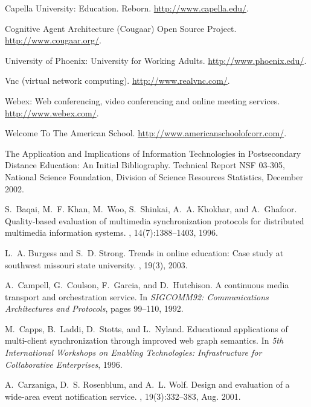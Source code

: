 \documentclass{sig-alternate}
\begin{document}
\begin{thebibliography}{10}
\small
{}
{Capella University: Education. Reborn.}
\newblock \url{http://www.capella.edu/}.

{Cognitive Agent Architecture (Cougaar) Open Source Project}.
\newblock \url{http://www.cougaar.org/}.

{University of Phoenix: University for Working Adults}.
\newblock \url{http://www.phoenix.edu/}.

Vnc (virtual network computing).
\newblock \url{http://www.realvnc.com/}.

Webex: Web conferencing, video conferencing and online meeting services.
\newblock \url{http://www.webex.com/}.

{Welcome To The American School}.
\newblock \url{http://www.americanschoolofcorr.com/}.

{The Application and Implications of Information Technologies in Postsecondary
  Distance Education: An Initial Bibliography}.
\newblock Technical Report NSF 03-305, {National Science Foundation, Division
  of Science Resources Statistics}, December 2002.

S.~Baqai, M.~F. Khan, M.~Woo, S.~Shinkai, A.~A. Khokhar, and A.~Ghafoor.
\newblock Quality-based evaluation of multimedia synchronization protocols for
  distributed multimedia information systems.
,
  14(7):1388--1403, 1996.

L.~A. Burgess and S.~D. Strong.
\newblock Trends in online education: Case study at southwest missouri state
  university.
, 19(3), 2003.

A.~Campell, G.~Coulson, F.~Garcia, and D.~Hutchison.
\newblock A continuous media transport and orchestration service.
\newblock In {\em {SIGCOMM92: Communications Architectures and Protocols}},
  pages 99--110, 1992.

M.~Capps, B.~Laddi, D.~Stotts, and L.~Nyland.
\newblock Educational applications of multi-client synchronization through
  improved web graph semantics.
\newblock In {\em 5th International Workshops on Enabling Technologies:
  Infrastructure for Collaborative Enterprises}, 1996.

A.~Carzaniga, D.~S. Rosenblum, and A.~L. Wolf.
\newblock Design and evaluation of a wide-area event notification service.
, 19(3):332--383, Aug.
  2001.


\end{thebibliography}
\end{document}
